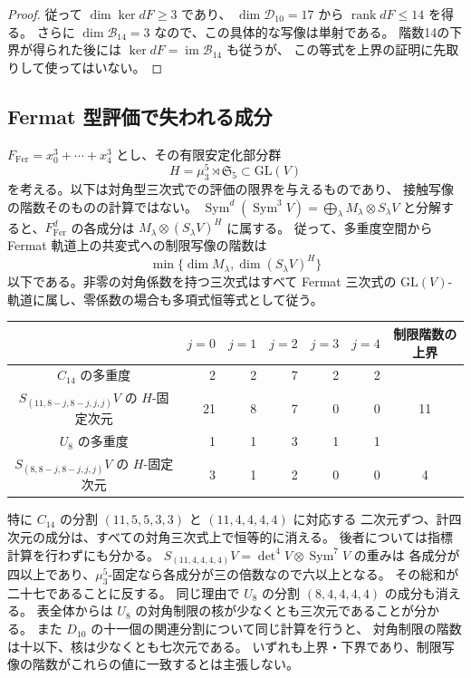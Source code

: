 \documentclass[a4paper,11pt]{ltjsarticle}
\theoremstyle{definition}
\begin{document}
\begin{proof}
従って $\dim\ker dF\ge3$ であり、
$\dim\mathcal D_{10}=17$ から $\operatorname{rank}dF\le14$ を得る。
さらに $\dim\mathcal B_{14}=3$ なので、この具体的な写像は単射である。
階数14の下界が得られた後には
$\ker dF=\operatorname{im}\mathcal B_{14}$ も従うが、
この等式を上界の証明に先取りして使ってはいない。
\end{proof}

\subsection{Fermat 型評価で失われる成分}\label{subsec:v11-fermat-scope}

\(F_{\mathrm{Fer}}=x_0^3+\cdots+x_4^3\) とし、その有限安定化部分群
\[
 H=\mu_3^5\rtimes\mathfrak S_5\subset\mathrm{GL}(V)
\]
を考える。以下は対角型三次式での評価の限界を与えるものであり、
接触写像の階数そのものの計算ではない。
\(
 \operatorname{Sym}^{d}(\operatorname{Sym}^{3}V)
 =\bigoplus_\lambda M_\lambda\otimes S_\lambda V
\)
と分解すると、\(F_{\mathrm{Fer}}^d\) の各成分は
\(M_\lambda\otimes(S_\lambda V)^H\) に属する。
従って、多重度空間から Fermat 軌道上の共変式への制限写像の階数は
\[
 \min\{\dim M_\lambda,\dim(S_\lambda V)^H\}
\]
以下である。非零の対角係数を持つ三次式はすべて Fermat 三次式の
\(\mathrm{GL}(V)\)-軌道に属し、零係数の場合も多項式恒等式として従う。

\begin{center}
\begin{tabular}{c|rrrrr|c}
 &\(j=0\)&\(j=1\)&\(j=2\)&\(j=3\)&\(j=4\)&制限階数の上界\\\hline
\(C_{14}\) の多重度&2&2&7&2&2&\\
\(S_{(11,8-j,8-j,j,j)}V\) の \(H\)-固定次元&21&8&7&0&0&11\\\hline
\(U_8\) の多重度&1&1&3&1&1&\\
\(S_{(8,8-j,8-j,j,j)}V\) の \(H\)-固定次元&3&1&2&0&0&4
\end{tabular}
\end{center}

特に \(C_{14}\) の分割 \((11,5,5,3,3)\) と \((11,4,4,4,4)\) に対応する
二次元ずつ、計四次元の成分は、すべての対角三次式上で恒等的に消える。
後者については指標計算を行わずにも分かる。
\(S_{(11,4,4,4,4)}V=\det^4V\otimes\operatorname{Sym}^7V\) の重みは
各成分が四以上であり、\(\mu_3^5\)-固定なら各成分が三の倍数なので六以上となる。
その総和が二十七であることに反する。
同じ理由で \(U_8\) の分割 \((8,4,4,4,4)\) の成分も消える。
表全体からは \(U_8\) の対角制限の核が少なくとも三次元であることが分かる。
また \(D_{10}\) の十一個の関連分割について同じ計算を行うと、
対角制限の階数は十以下、核は少なくとも七次元である。
いずれも上界・下界であり、制限写像の階数がこれらの値に一致するとは主張しない。
\end{document}
